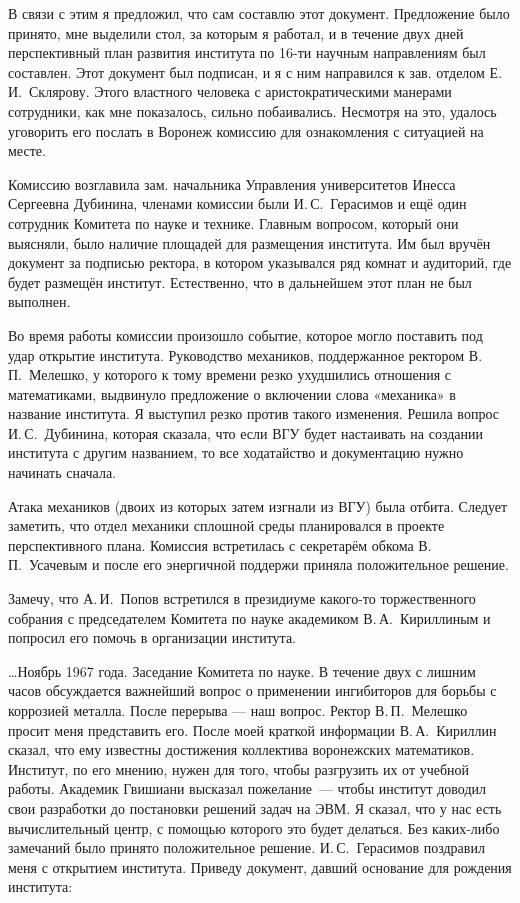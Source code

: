 В связи с этим я предложил, что сам составлю этот документ. Предложение было принято, мне выделили стол, за которым я работал, и в течение двух
дней перспективный план развития института по 16-ти научным направлениям был составлен. Этот документ был подписан, и я с ним направился к зав. отделом Е.\,И.~Склярову. Этого властного человека с аристократическими манерами сотрудники, как мне показалось, сильно побаивались. Несмотря на это, удалось уговорить его послать в Воронеж комиссию для ознакомления с ситуацией на месте.

Комиссию возглавила зам. начальника Управления университетов Инесса Сергеевна Дубинина, членами комиссии были И.\,С.~Герасимов и ещё один сотрудник Комитета по науке и технике. Главным вопросом, который они выясняли, было наличие площадей для размещения института. Им был вручён документ за подписью ректора, в котором указывался ряд комнат и аудиторий, где будет размещён институт. Естественно, что в дальнейшем этот план не был выполнен.

Во время работы комиссии произошло событие, которое могло поставить под удар открытие института.
Руководство механиков, поддержанное ректором В.\,П.~Мелешко,
у которого к тому времени резко ухудшились отношения с математиками,
выдвинуло предложение о включении слова «механика» в название института.
Я выступил резко против такого изменения.
Решила вопрос И.\,С.~Дубинина, которая сказала, что если ВГУ будет настаивать на создании института с другим названием,
то все ходатайство и документацию нужно начинать сначала.

Атака механиков (двоих из которых затем изгнали из ВГУ) была отбита.
Следует заметить, что отдел механики сплошной среды планировался в проекте перспективного плана.
Комиссия встретилась с секретарём обкома В.\,П.~Усачевым и после его энергичной поддержи приняла положительное решение.

Замечу, что А.\,И.~Попов встретился в президиуме какого-то торжественного собрания
с председателем Комитета по науке академиком В.\,А.~Кириллиным и попросил его помочь в организации института.

\ldots Ноябрь 1967 года. Заседание Комитета по науке.
В течение двух с лишним часов обсуждается важнейший вопрос о применении ингибиторов для борьбы с коррозией металла.
После перерыва --- наш вопрос. Ректор В.\,П.~Мелешко просит меня представить его.
После моей краткой информации В.\,А.~Кириллин сказал, что ему известны достижения коллектива воронежских математиков.
Институт, по его мнению, нужен для того, чтобы разгрузить их от учебной работы.
Академик Гвишиани высказал пожелание~--- чтобы институт доводил свои разработки до постановки решений задач на ЭВМ.
Я сказал, что у нас есть вычислительный центр, с помощью которого это будет делаться.
Без каких-либо замечаний было принято положительное решение.
И.\,С.~Герасимов поздравил меня с открытием института. Приведу документ, давший основание для рождения института:


